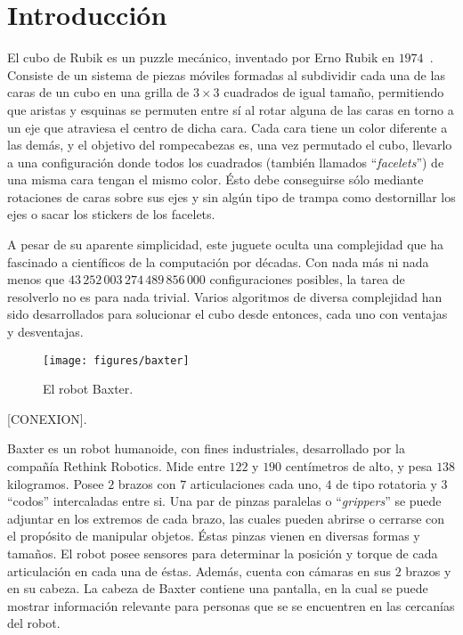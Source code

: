 \chapter{Introducción}

El cubo de Rubik es un puzzle mecánico, inventado por Erno Rubik en $1974$~\cite{ernorubik1974}. Consiste de un sistema de piezas móviles formadas al subdividir cada una de las caras de un cubo en una grilla de $3\times 3$ cuadrados de igual tamaño, permitiendo que aristas y esquinas se permuten entre sí al rotar alguna de las caras en torno a un eje que atraviesa el centro de dicha cara. Cada cara tiene un color diferente a las demás, y el objetivo del rompecabezas es, una vez permutado el cubo, llevarlo a una configuración donde todos los cuadrados (también llamados ``\emph{facelets}'') de una misma cara tengan el mismo color. Ésto debe conseguirse sólo mediante rotaciones de caras sobre sus ejes y sin algún tipo de trampa como destornillar los ejes o sacar los stickers de los facelets.

A pesar de su aparente simplicidad, este juguete oculta una complejidad que ha fascinado a científicos de la computación por décadas. Con nada más ni nada menos que $43\,252\,003\,274\,489\,856\,000$ configuraciones posibles\cite{mathematicsrubik}\cite{mathematicsrubik2}, la tarea de resolverlo no es para nada trivial. Varios algoritmos de diversa complejidad han sido desarrollados para solucionar el cubo desde entonces, cada uno con ventajas y desventajas.

\begin{figure}[ht]
	\centering
	\texttt{[image: figures/baxter]}
	\caption{El robot Baxter.}
	\label{baxter}
\end{figure}

[CONEXION].

Baxter es un robot humanoide, con fines industriales, desarrollado por la compañía Rethink Robotics\cite{baxterproduct}. Mide entre $122$ y $190$ centímetros de alto, y pesa $138$ kilogramos. Posee $2$ brazos con $7$ articulaciones cada uno, $4$ de tipo rotatoria y $3$ ``codos'' intercaladas entre si. Una par de pinzas paralelas o ``\emph{grippers}'' se puede adjuntar en los extremos de cada brazo, las cuales pueden abrirse o cerrarse con el propósito de manipular objetos. Éstas pinzas vienen en diversas formas y tamaños. El robot posee sensores para determinar la posición y torque de cada articulación en cada una de éstas. Además, cuenta con cámaras en sus $2$ brazos y en su cabeza. La cabeza de Baxter contiene una pantalla, en la cual se puede mostrar información relevante para personas que se se encuentren en las cercanías del robot\cite{baxterspecs}.

